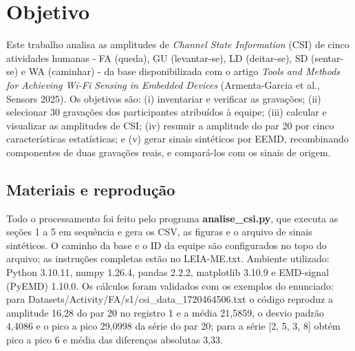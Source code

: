 \section{Objetivo}

Este trabalho analisa as amplitudes de \textit{Channel State Information} (CSI) de cinco atividades humanas - FA (queda), GU (levantar-se), LD (deitar-se), SD (sentar-se) e WA (caminhar) - da base disponibilizada com o artigo \textit{Tools and Methods for Achieving Wi-Fi Sensing in Embedded Devices} (Armenta-Garcia et al., Sensors 2025). Os objetivos são: (i) inventariar e verificar as gravações; (ii) selecionar 30 gravações dos participantes atribuídos à equipe; (iii) calcular e visualizar as amplitudes de CSI; (iv) resumir a amplitude do par 20 por cinco características estatísticas; e (v) gerar sinais sintéticos por EEMD, recombinando componentes de duas gravações reais, e compará-los com os sinais de origem.

\subsection{Materiais e reprodução}

Todo o processamento foi feito pelo programa \textbf{analise\_csi.py}, que executa as seções 1 a 5 em sequência e gera os CSV, as figuras e o arquivo de sinais sintéticos. O caminho da base e o ID da equipe são configurados no topo do arquivo; as instruções completas estão no LEIA-ME.txt. Ambiente utilizado: Python 3.10.11, numpy 1.26.4, pandas 2.2.2, matplotlib 3.10.9 e EMD-signal (PyEMD) 1.10.0. Os cálculos foram validados com os exemplos do enunciado: para Datasets/Activity/FA/s1/csi\_data\_1720464506.txt o código reproduz a amplitude 16,28 do par 20 no registro 1 e a média 21,5859, o desvio padrão 4,4086 e o pico a pico 29,0998 da série do par 20; para a série [2, 5, 3, 8] obtém pico a pico 6 e média das diferenças absolutas 3,33.
